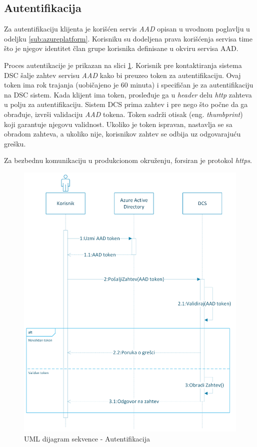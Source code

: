 \documentclass[12pt,oneside]{memoir}
\begin{document}
\subsection{Autentifikacija}

Za autentifikaciju klijenta je korišćen servis \emph{AAD} \cite{AAD} opisan u uvodnom poglavlju u odeljku \ref{sub:azureplatform}. Korisniku su dodeljena prava korišćenja servisa time što je njegov identitet član grupe korisnika definisane u okviru servisa AAD.

Proces autentikacije je prikazan na slici \ref{fig:autentifikacija}. Korisnik pre kontaktiranja sistema DSC šalje zahtev servisu \emph{AAD} kako bi preuzeo token za autentifikaciju. Ovaj token ima rok trajanja (uobičajeno je 60 minuta) i specifičan je za autentifikaciju na DSC sistem. Kada klijent ima token, prosleđuje ga u \emph{header} delu \emph{http} zahteva u polju za autentifikaciju. Sistem DCS prima zahtev i pre nego što počne da ga obrađuje, izvrši validaciju \emph{AAD} tokena. Token sadrži otisak (eng. \emph{thumbprint}) koji garantuje njegovu validnost. Ukoliko je token ispravan, nastavlja se sa obradom zahteva, a ukoliko nije, korisnikov zahtev se odbija uz odgovarajuću grešku.

Za bezbednu komunikaciju u produkcionom okruženju, forsiran je protokol \emph{https}.

\begin{figure}[!ht]
  \centering
  \includegraphics[width=1.0\textwidth]{./images/autentikacija_uml_dijagram_sekvence.png}
  \caption{UML dijagram sekvence - Autentifikacija}
  \label{fig:autentifikacija}
\end{figure}
\end{document}
